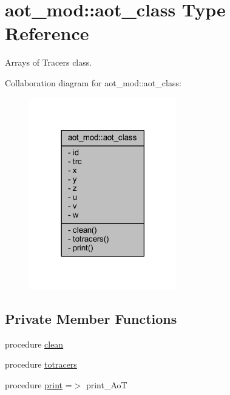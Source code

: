 \hypertarget{structaot__mod_1_1aot__class}{}\section{aot\+\_\+mod\+:\+:aot\+\_\+class Type Reference}
\label{structaot__mod_1_1aot__class}


Arrays of Tracers class.  




Collaboration diagram for aot\+\_\+mod\+:\+:aot\+\_\+class\+:
\nopagebreak
\begin{figure}[H]
\begin{center}
\leavevmode
\includegraphics[width=182pt]{structaot__mod_1_1aot__class__coll__graph}
\end{center}
\end{figure}
\subsection*{Private Member Functions}
\begin{DoxyCompactItemize}
\item 
procedure \mbox{\hyperlink{structaot__mod_1_1aot__class_aab1eb00e5cd2868ff08fcd5bb1529688}{clean}}
\item 
procedure \mbox{\hyperlink{structaot__mod_1_1aot__class_a834962484645337446945ae834ea5293}{totracers}}
\item 
procedure \mbox{\hyperlink{structaot__mod_1_1aot__class_a92925f914d4cc5f252e4ca638e104628}{print}} =$>$ print\+\_\+\+AoT
\end{DoxyCompactItemize}
